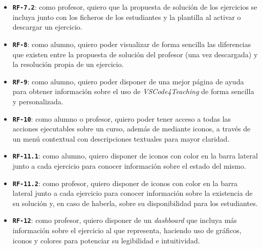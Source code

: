 \begin{itemize}
    \item \texttt{\textbf{RF-7.2}}: como profesor, quiero que la propuesta de solución de los ejercicios se incluya junto con los ficheros de los estudiantes y la plantilla al activar o descargar un ejercicio.
    \item \texttt{\textbf{RF-8}}: como alumno, quiero poder visualizar de forma sencilla las diferencias que existen entre la propuesta de solución del profesor (una vez descargada) y la resolución propia de un ejercicio.
    \item \texttt{\textbf{RF-9}}: como alumno, quiero poder disponer de una mejor página de ayuda para obtener información sobre el uso de \textit{VSCode4Teaching} de forma sencilla y personalizada.
    \item \texttt{\textbf{RF-10}}: como alumno o profesor, quiero poder tener acceso a todas las acciones ejecutables sobre un curso, además de mediante iconos, a través de un menú contextual con descripciones textuales para mayor claridad.
    \item \texttt{\textbf{RF-11.1}}: como alumno, quiero disponer de iconos con color en la barra lateral junto a cada ejercicio para conocer información sobre el estado del mismo.
    \item \texttt{\textbf{RF-11.2}}: como profesor, quiero disponer de iconos con color en la barra lateral junto a cada ejercicio para conocer información sobre la existencia de su solución y, en caso de haberla, sobre su disponibilidad para los estudiantes.
    \item \texttt{\textbf{RF-12}}: como profesor, quiero disponer de un \textit{dashboard} que incluya más información sobre el ejercicio al que representa, haciendo uso de gráficos, iconos y colores para potenciar su legibilidad e intuitividad.
\end{itemize}

